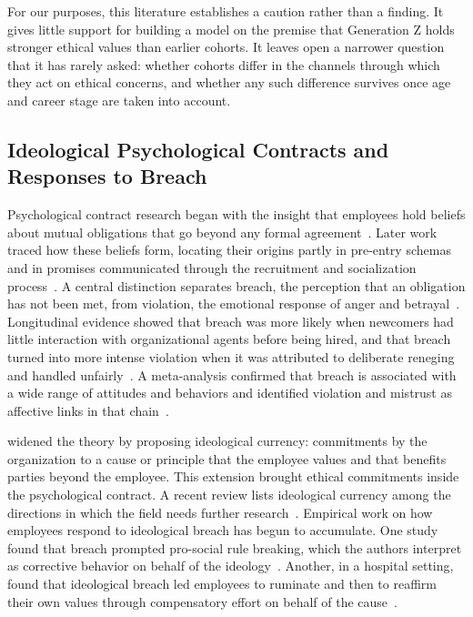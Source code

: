 For our purposes, this literature establishes a caution rather than a finding. It gives little support for building a model on the premise that Generation Z holds stronger ethical values than earlier cohorts. It leaves open a narrower question that it has rarely asked: whether cohorts differ in the channels through which they act on ethical concerns, and whether any such difference survives once age and career stage are taken into account.

\subsection{Ideological Psychological Contracts and Responses to Breach}

Psychological contract research began with the insight that employees hold beliefs about mutual obligations that go beyond any formal agreement~\citep{rousseau1989psychological}. Later work traced how these beliefs form, locating their origins partly in pre-entry schemas and in promises communicated through the recruitment and socialization process~\citep{rousseau2001schema}. A central distinction separates breach, the perception that an obligation has not been met, from violation, the emotional response of anger and betrayal~\citep{morrison1997employees}. Longitudinal evidence showed that breach was more likely when newcomers had little interaction with organizational agents before being hired, and that breach turned into more intense violation when it was attributed to deliberate reneging and handled unfairly~\citep{robinson2000development}. A meta-analysis confirmed that breach is associated with a wide range of attitudes and behaviors and identified violation and mistrust as affective links in that chain~\citep{zhao2007impact}.

\citet{thompson2003violations} widened the theory by proposing ideological currency: commitments by the organization to a cause or principle that the employee values and that benefits parties beyond the employee. This extension brought ethical commitments inside the psychological contract. A recent review lists ideological currency among the directions in which the field needs further research~\citep{coyleshapiro2019psychological}. Empirical work on how employees respond to ideological breach has begun to accumulate. One study found that breach prompted pro-social rule breaking, which the authors interpret as corrective behavior on behalf of the ideology~\citep{yang2022going}. Another, in a hospital setting, found that ideological breach led employees to ruminate and then to reaffirm their own values through compensatory effort on behalf of the cause~\citep{deng2023serving}.

